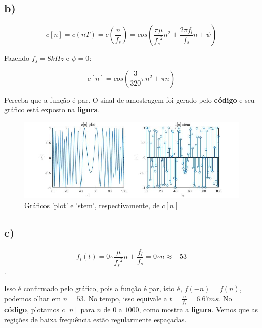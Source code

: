 \documentclass[a4paper, 12pt]{article}
\begin{document}
\subsection{b)}

$$c[n]=c(nT)=c(\frac{n}{f_s})=cos(\frac{\pi \mu}{{f_s}^2}n^2 + \frac{2\pi f_l}{f_s}n + \psi)$$

Fazendo $f_s=8kHz$ e $\psi=0$:

$$c[n] = cos(\frac{3}{320}\pi n^2 + \pi n)$$

Perceba que a função é par. O sinal de amostragem foi gerado pelo \textbf{código} e seu gráfico está exposto na \textbf{figura}. 



\begin{figure}[H]
	\centering
	\includegraphics[scale=0.6]{../Imagens/ex2/b.jpg} 
	\caption{Gráficos 'plot' e 'stem', respectivamente, de $c[n]$}
	\label{fig:1a}
\end{figure}

\subsection{c)}

$$f_i(t) = 0 \therefore \frac{\mu}{{f_s}^2}n + \frac{f_l}{f_s} = 0 \therefore n\approx -53$$.

Isso é confirmado pelo gráfico, pois a função é par, isto é, $f(-n)=f(n)$, podemos olhar em $n=53$. No tempo, isso equivale a $t=\frac{n}{f_s}=6.67ms$. No \textbf{código}, plotamos $c[n]$ para $n$ de $0$ a $1000$, como mostra a \textbf{figura}. Vemos que as regições de baixa frequência estão regularmente espaçadas.


\end{document}

